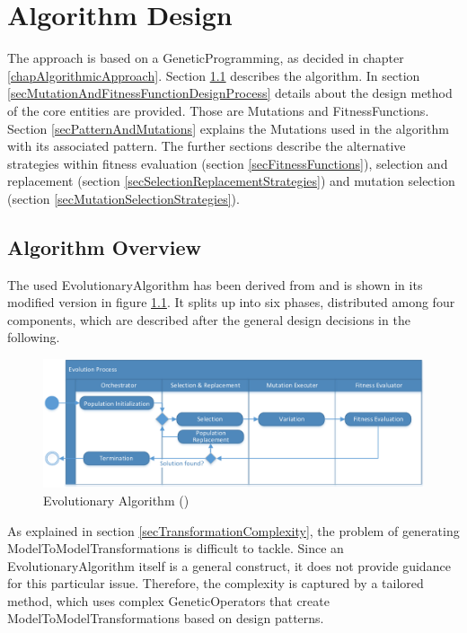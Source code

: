 \chapter{Algorithm Design}\label{chapAlogrithmDesign}

The approach is based on a \gls{GeneticProgramming}, as decided in chapter \ref{chapAlgorithmicApproach}. Section \ref{secAlgorithmOverview} describes the algorithm. In section \ref{secMutationAndFitnessFunctionDesignProcess} details about the design method of the core entities are provided. Those are \glspl{Mutation} and \glspl{FitnessFunction}. Section \ref{secPatternAndMutations} explains the \glspl{Mutation} used in the algorithm with its associated pattern. The further sections describe the alternative strategies within fitness evaluation (section \ref{secFitnessFunctions}), selection and replacement (section \ref{secSelectionReplacementStrategies}) and mutation selection (section \ref{secMutationSelectionStrategies}).

\section{Algorithm Overview}
\label{secAlgorithmOverview}

The used \gls{EvolutionaryAlgorithm} has been derived from \cite{Ashlock2004} and is shown in its modified version in figure \ref{figEvolutionaryAlgorithm}. It splits up into six phases, distributed among four components, which are described after the general design decisions in the following. 

\begin{figure}[htb]
	\centering
	\includegraphics[scale=0.75]{Images/AlgorithmEA.pdf} 
	\caption{Evolutionary Algorithm (\cite{Ashlock2004})}
	\label{figEvolutionaryAlgorithm}
\end{figure}

As explained in section \ref{secTransformationComplexity}, the problem of generating \glspl{ModelToModelTransformation} is difficult to tackle. Since an \gls{EvolutionaryAlgorithm} itself is a general construct, it does not provide guidance for this particular issue. Therefore, the complexity is captured by a tailored method, which uses complex \glspl{GeneticOperator} that create \glspl{ModelToModelTransformation} based on design patterns.

